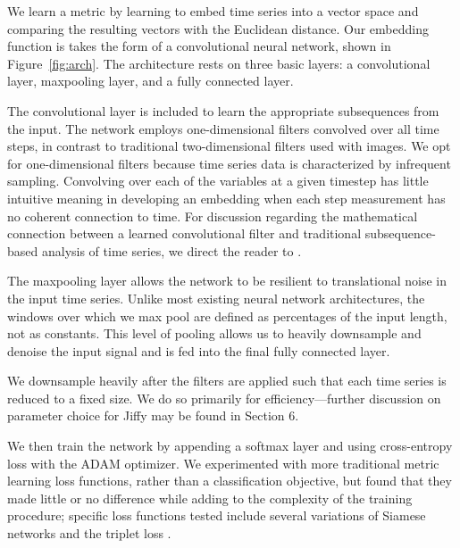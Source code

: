 We learn a metric by learning to embed time series into a vector space and comparing the resulting vectors with the Euclidean distance. Our embedding function is takes the form of a convolutional neural network, shown in Figure~\ref{fig:arch}. The architecture rests on three basic layers: a convolutional layer, maxpooling layer, and a fully connected layer.

The convolutional layer is included to learn the appropriate subsequences from the input. The network employs one-dimensional filters convolved over all time steps, in contrast to traditional two-dimensional filters used with images. We opt for one-dimensional filters because time series data is characterized by infrequent sampling. Convolving over each of the variables at a given timestep has little intuitive meaning in developing an embedding when each step measurement has no coherent connection to time.  For discussion regarding the mathematical connection between a learned convolutional filter and traditional subsequence-based analysis of time series, we direct the reader to \citep{cui2016multi}.

The maxpooling layer allows the network to be resilient to translational noise in the input time series. Unlike most existing neural network architectures, the windows over which we max pool are defined as percentages of the input length, not as constants. This level of pooling allows us to heavily downsample and denoise the input signal and is fed into the final fully connected layer.

We downsample heavily after the filters are applied such that each time series is reduced to a fixed size. We do so primarily for efficiency---further discussion on parameter choice for Jiffy may be found in Section 6.

We then train the network by appending a softmax layer and using cross-entropy loss with the ADAM \citep{adam} optimizer. We experimented with more traditional metric learning loss functions, rather than a classification objective, but found that they made little or no difference while adding to the complexity of the training procedure; specific loss functions tested include several variations of Siamese networks \citep{siameseOrig,siameseRecurrent} and the triplet loss \citep{tripletMetric}. %


